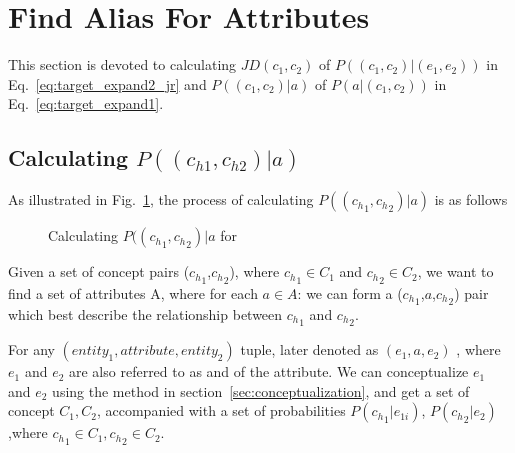 
\section{Find Alias For Attributes}
\label{sec:fafa}





This section is devoted to calculating $JD(c_1,c_2)$ of $P((c_{1},c_{2})|(e_{1},e_{2}))$ in Eq.~\ref{eq:target_expand2_jr} and $P((c_{1},c_{2})|a)$ of $P(a|(c_{1},c_{2}))$ in Eq.~\ref{eq:target_expand1}. 







\subsection{Calculating $P((c_{h1},c_{h2})|a)$ }

\begin{example}[Calculating $P(({c_h}_{1},{c_h}_{2}) |a)$]
\label{exa:pggga}
As illustrated in Fig.~\ref{fig:bipartite}, the process of calculating $P(({c_h}_{1},{c_h}_{2}) |a)$ is as follows\term{}
\end{example}


\begin{figure}[!htb]
\centering {}
\caption{Calculating $P(({c_h}_{1},{c_h}_{2}) |a$ for \term{}} \label{fig:bipartite}
\end{figure}

Given a set of concept pairs (${c_h}_1$,${c_h}_2$), where ${c_h}_1\in C_1$ and ${c_h}_2\in C_2$, we want to find a set of attributes A, where for each $a \in A$:
we can form a (${c_h}_1$,$a$,${c_h}_2$) pair which best describe the relationship between ${c_h}_1$ and ${c_h}_2$.



For any $(entity_1, attribute, entity_2)$ tuple, later denoted as  $(e_1, a, e_2)$ , where $e_1$ and $e_2$ are also referred to as  and  of the attribute. We can conceptualize $e_1$ and $e_2$ using the method in section~\ref{sec:conceptualization}, and get a set of concept $C_1,C_2$, accompanied with a set of probabilities $P({c_h}_{1}|e_{1i})$, $P({c_h}_{2}|e_2)$,where ${{c_h}_{1} \in C_1},{{c_h}_{2} \in C_2}$.

